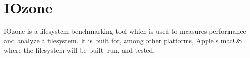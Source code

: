 \section{IOzone}
IOzone is a filesystem benchmarking tool which is used to measures performance and analyze a filesystem\cite{IozoneFilesystemBenchmark}. It is built for, among other platforms, Apple's macOS where the filesystem will be built, run, and tested. 